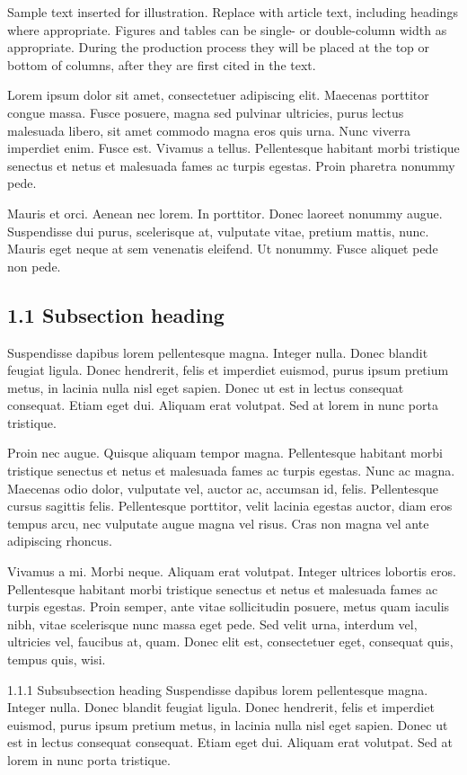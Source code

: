 \documentclass{article}
\begin{document}
Sample text inserted for illustration. Replace with article text, including headings where appropriate. Figures and tables can be single- or double-column width as appropriate. During the production process they will be placed at the top or bottom of columns, after they are first cited in the text. 

Lorem ipsum dolor sit amet, consectetuer adipiscing elit. Maecenas porttitor congue massa. Fusce posuere, magna sed pulvinar ultricies, purus lectus malesuada libero, sit amet commodo magna eros quis urna. Nunc viverra imperdiet enim. Fusce est. Vivamus a tellus. Pellentesque habitant morbi tristique senectus et netus et malesuada fames ac turpis egestas. Proin pharetra nonummy pede.

Mauris et orci. Aenean nec lorem. In porttitor. Donec laoreet nonummy augue. Suspendisse dui purus, scelerisque at, vulputate vitae, pretium mattis, nunc. Mauris eget neque at sem venenatis eleifend. Ut nonummy. Fusce aliquet pede non pede.

\subsection{1.1 Subsection heading}

Suspendisse dapibus lorem pellentesque magna. Integer nulla. Donec blandit feugiat ligula. Donec hendrerit, felis et imperdiet euismod, purus ipsum pretium metus, in lacinia nulla nisl eget sapien. Donec ut est in lectus consequat consequat. Etiam eget dui. Aliquam erat volutpat. Sed at lorem in nunc porta tristique.

Proin nec augue. Quisque aliquam tempor magna. Pellentesque habitant morbi tristique senectus et netus et malesuada fames ac turpis egestas. Nunc ac magna. Maecenas odio dolor, vulputate vel, auctor ac, accumsan id, felis. Pellentesque cursus sagittis felis. Pellentesque porttitor, velit lacinia egestas auctor, diam eros tempus arcu, nec vulputate augue magna vel risus. Cras non magna vel ante adipiscing rhoncus.

Vivamus a mi. Morbi neque. Aliquam erat volutpat. Integer ultrices lobortis eros. Pellentesque habitant morbi tristique senectus et netus et malesuada fames ac turpis egestas. Proin semper, ante vitae sollicitudin posuere, metus quam iaculis nibh, vitae scelerisque nunc massa eget pede. Sed velit urna, interdum vel, ultricies vel, faucibus at, quam. Donec elit est, consectetuer eget, consequat quis, tempus quis, wisi.

1.1.1 Subsubsection heading Suspendisse dapibus lorem pellentesque magna. Integer nulla. Donec blandit feugiat ligula. Donec hendrerit, felis et imperdiet euismod, purus ipsum pretium metus, in lacinia nulla nisl eget sapien. Donec ut est in lectus consequat consequat. Etiam eget dui. Aliquam erat volutpat. Sed at lorem in nunc porta tristique.
\end{document}
